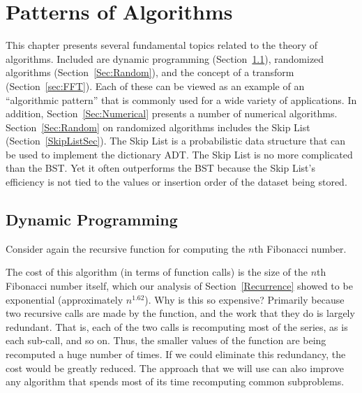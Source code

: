 
\chapter{Patterns of Algorithms}
\label{Algorithms}
\def\CHHEAD{Chap.\ \thechapter\ Patterns of Algorithms}    %

This chapter presents several fundamental topics related to the theory of
algorithms.
Included are dynamic programming (Section~\ref{DynamicProg}),
randomized algorithms (Section~\ref{Sec:Random}),
and the concept of a transform (Section~\ref{sec:FFT}).
Each of these can be viewed as an example of an ``algorithmic
pattern'' that is commonly used for a wide variety of applications.
In addition, Section~\ref{Sec:Numerical} presents
a number of numerical algorithms.
Section~\ref{Sec:Random} on randomized algorithms includes the
Skip List (Section~\ref{SkipListSec}).
The Skip List is
a probabilistic data
structure that can be used to implement the
dictionary ADT.
The Skip List is no more complicated than the BST.
Yet it often outperforms the BST because the Skip List's efficiency is
not tied to the values or insertion order of the dataset being stored.

\section{Dynamic Programming}
\label{DynamicProg}

Consider again the recursive function for computing the $n$th
Fibonacci number.


The cost of this algorithm (in terms of function calls) is the size of
the $n$th Fibonacci number itself, which our analysis of
Section~\ref{Recurrence} showed to be exponential
(approximately $n^{1.62}$). 
Why is this so expensive?
Primarily because two recursive calls are made by the
function, and the work that they do is largely redundant.
That is, each of the two calls is recomputing most of the series, as
is each sub-call, and so on.
Thus, the smaller values of the function are being recomputed a huge
number of times.
If we could eliminate this redundancy, the cost would be greatly
reduced.
The approach that we will use can also improve any algorithm that
spends most of its time recomputing common subproblems.

